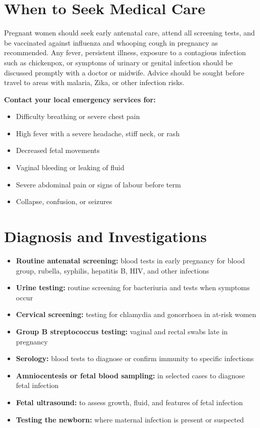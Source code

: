 \section*{When to Seek Medical Care}
Pregnant women should seek early antenatal care, attend all screening tests, and be vaccinated against influenza and whooping cough in pregnancy as recommended. Any fever, persistent illness, exposure to a contagious infection such as chickenpox, or symptoms of urinary or genital infection should be discussed promptly with a doctor or midwife. Advice should be sought before travel to areas with malaria, Zika, or other infection risks.

\textbf{Contact your local emergency services for:}
\begin{itemize}
    \item Difficulty breathing or severe chest pain
    \item High fever with a severe headache, stiff neck, or rash
    \item Decreased fetal movements
    \item Vaginal bleeding or leaking of fluid
    \item Severe abdominal pain or signs of labour before term
    \item Collapse, confusion, or seizures
\end{itemize}

\section*{Diagnosis and Investigations}
\begin{itemize}
    \item \textbf{Routine antenatal screening:} blood tests in early pregnancy for blood group, rubella, syphilis, hepatitis B, HIV, and other infections
    \item \textbf{Urine testing:} routine screening for bacteriuria and tests when symptoms occur
    \item \textbf{Cervical screening:} testing for chlamydia and gonorrhoea in at-risk women
    \item \textbf{Group B streptococcus testing:} vaginal and rectal swabs late in pregnancy
    \item \textbf{Serology:} blood tests to diagnose or confirm immunity to specific infections
    \item \textbf{Amniocentesis or fetal blood sampling:} in selected cases to diagnose fetal infection
    \item \textbf{Fetal ultrasound:} to assess growth, fluid, and features of fetal infection
    \item \textbf{Testing the newborn:} where maternal infection is present or suspected
\end{itemize}

